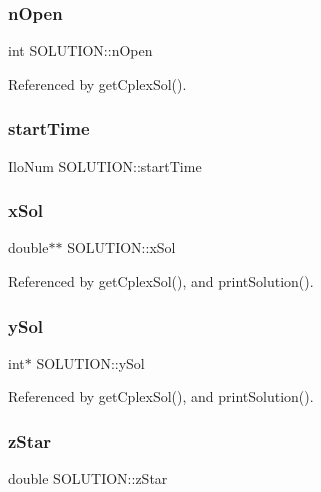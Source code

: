 \subsubsection{n\+Open}
{\footnotesize\ttfamily int S\+O\+L\+U\+T\+I\+O\+N\+::n\+Open}



Referenced by get\+Cplex\+Sol().

\mbox{\label{structSOLUTION_a3a5f379eb28419f4f4e2bde3503b1490}} 
\subsubsection{start\+Time}
{\footnotesize\ttfamily Ilo\+Num S\+O\+L\+U\+T\+I\+O\+N\+::start\+Time}

\mbox{\label{structSOLUTION_a00dd4c6acc8c4855907129f0824011f4}} 
\subsubsection{x\+Sol}
{\footnotesize\ttfamily double$\ast$$\ast$ S\+O\+L\+U\+T\+I\+O\+N\+::x\+Sol}



Referenced by get\+Cplex\+Sol(), and print\+Solution().

\mbox{\label{structSOLUTION_ad5f89e3522ac2eca6d42748026f18ff2}} 
\subsubsection{y\+Sol}
{\footnotesize\ttfamily int$\ast$ S\+O\+L\+U\+T\+I\+O\+N\+::y\+Sol}



Referenced by get\+Cplex\+Sol(), and print\+Solution().

\mbox{\label{structSOLUTION_ade090dee207193de4c06605732ede125}} 
\subsubsection{z\+Star}
{\footnotesize\ttfamily double S\+O\+L\+U\+T\+I\+O\+N\+::z\+Star}



